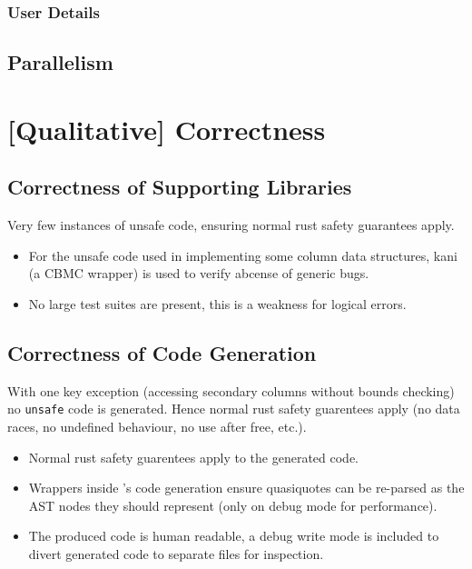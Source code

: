 \subsubsection{User Details}

\subsection{Parallelism}


\section{[Qualitative] Correctness}
\subsection{Correctness of Supporting Libraries}
Very few instances of unsafe code, ensuring normal rust safety guarantees apply.
\begin{itemize}
    \item For the unsafe code used in implementing some column data structures, kani\cite{KaniGithub} (a CBMC\cite{DiffBlueCBMC} wrapper) is used to verify abcense of generic bugs.
    \item No large test suites are present, this is a weakness for logical errors.
\end{itemize}

\subsection{Correctness of Code Generation}
With one key exception (accessing secondary columns without bounds checking) no \texttt{unsafe} code is generated. Hence normal rust safety guarentees apply (no data races, no undefined behaviour, no use after free, etc.).
\begin{itemize}
    \item Normal rust safety guarentees apply to the generated code.
    \item Wrappers inside \emdb's code generation ensure quasiquotes can be re-parsed as the AST nodes they should represent (only on debug mode for performance).
    \item The produced code is human readable, a debug write mode is included to divert generated code to separate files for inspection.
\end{itemize}

